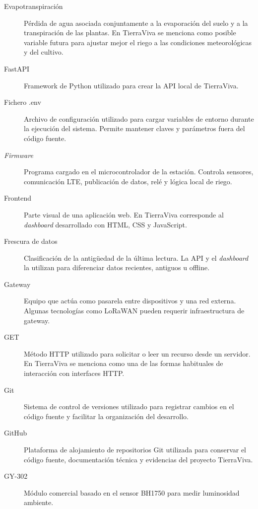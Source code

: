 \begin{description}
    \item[Evapotranspiración]
    Pérdida de agua asociada conjuntamente a la evaporación del suelo y a la transpiración de las plantas. En TierraViva se menciona como posible variable futura para ajustar mejor el riego a las condiciones meteorológicas y del cultivo.

    \item[FastAPI]
    Framework de Python utilizado para crear la API local de TierraViva.

    \item[Fichero .env]
    Archivo de configuración utilizado para cargar variables de entorno durante la ejecución del sistema. Permite mantener claves y parámetros fuera del código fuente.

    \item[\textit{Firmware}]
    Programa cargado en el microcontrolador de la estación. Controla sensores, comunicación LTE, publicación de datos, relé y lógica local de riego.

    \item[Frontend]
    Parte visual de una aplicación web. En TierraViva corresponde al \textit{dashboard} desarrollado con HTML, CSS y JavaScript.

    \item[Frescura de datos]
    Clasificación de la antigüedad de la última lectura. La API y el \textit{dashboard} la utilizan para diferenciar datos recientes, antiguos u offline.

    \item[Gateway]
    Equipo que actúa como pasarela entre dispositivos y una red externa. Algunas tecnologías como LoRaWAN pueden requerir infraestructura de gateway.

    \item[GET]
    Método HTTP utilizado para solicitar o leer un recurso desde un servidor. En TierraViva se menciona como una de las formas habituales de interacción con interfaces HTTP.

    \item[Git]
    Sistema de control de versiones utilizado para registrar cambios en el código fuente y facilitar la organización del desarrollo.

    \item[GitHub]
    Plataforma de alojamiento de repositorios Git utilizada para conservar el código fuente, documentación técnica y evidencias del proyecto TierraViva.

    \item[GY-302]
    Módulo comercial basado en el sensor BH1750 para medir luminosidad ambiente.


\end{description}
